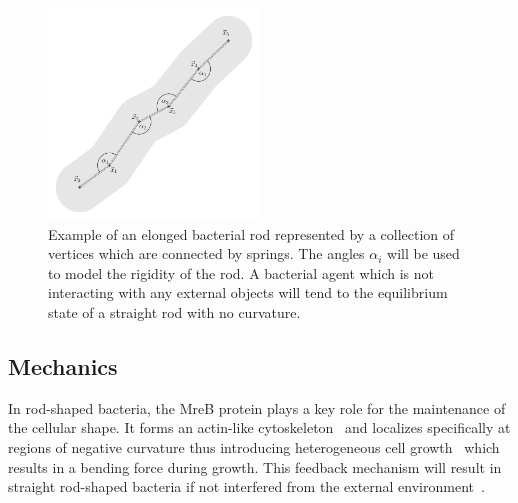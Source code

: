 \documentclass[10pt,letterpaper]{article}
\begin{document}
\begin{figure}
    \centering
    \includegraphics[width=0.5\textwidth]{docs/source/_static/mechanics.png}
    \caption{
        Example of an elonged bacterial rod represented by a collection of vertices which are
        connected by springs.
        The angles $\alpha_i$ will be used to model the rigidity of the rod.
        A bacterial agent which is not interacting with any external objects will tend to the
        equilibrium state of a straight rod with no curvature.
    }
    \label{fig:mechanics-bacterium}
\end{figure}

\subsection{Mechanics}
\label{subsection:mechanical-model-mechanics}
In rod-shaped bacteria, the MreB protein plays a key role for the maintenance of the cellular shape.
It forms an actin-like cytoskeleton~\cite{Erickson2001,Dersch2020} and localizes specifically at
regions of negative curvature thus introducing heterogeneous cell growth~\cite{Ursell2014} which
results in a bending force during growth.
This feedback mechanism will result in straight rod-shaped bacteria if not interfered from the
external environment~\cite{Wang2010}.
\end{document}
